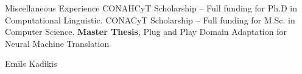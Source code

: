 \begin{rubric}{Miscellaneous Experience}
\entry*[2021]%
     CONAHCyT Scholarship -- Full funding for Ph.D in Computational Linguistic.
\entry*[2015]%
    CONACyT Scholarship -- Full funding for M.Sc. in Computer Science.
\entry*[2023] \textbf{Master Thesis}, Plug and Play Domain Adaptation for Neural Machine Translation\par
Emīls Kadiķis

\end{rubric}